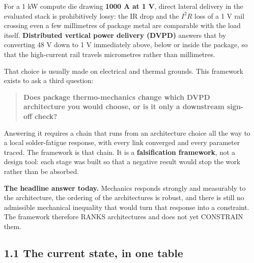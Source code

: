 \documentclass[10pt,]{article}
\begin{document}
For a 1 kW compute die drawing \textbf{1000 A at 1 V}, direct lateral
delivery in the evaluated stack is prohibitively lossy: the IR drop and
the \(I^2R\) loss of a 1 V rail crossing even a few millimetres of
package metal are comparable with the load itself. \textbf{Distributed
vertical power delivery (DVPD)} answers that by converting 48 V down to
1 V immediately above, below or inside the package, so that the
high-current rail travels micrometres rather than millimetres.

That choice is usually made on electrical and thermal grounds. This
framework exists to ask a third question:

\begin{quote}
\textbf{Does package thermo-mechanics change which DVPD architecture you
would choose, or is it only a downstream sign-off check?}
\end{quote}

Answering it requires a chain that runs from an architecture choice all
the way to a local solder-fatigue response, with every link converged
and every parameter traced. The framework is that chain. It is a
\textbf{falsification framework}, not a design tool: each stage was
built so that a negative result would stop the work rather than be
absorbed.

\textbf{The headline answer today.} Mechanics responds strongly and
measurably to the architecture, the ordering of the architectures is
robust, and there is still no admissible mechanical inequality that
would turn that response into a constraint. The framework therefore
RANKS architectures and does not yet CONSTRAIN them.

\hypertarget{the-current-state-in-one-table}{%
\subsection{1.1 The current state, in one
table}\label{the-current-state-in-one-table}}
\end{document}
